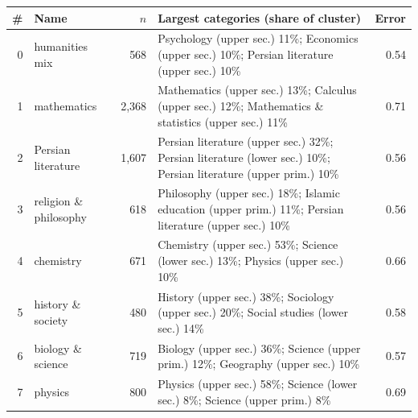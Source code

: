 \begin{tabular}{rlr>{\raggedright\arraybackslash}p{8.2cm}r}
\toprule
\# & Name & $n$ & Largest categories (share of cluster) & Error \\
\midrule
0 & humanities mix & 568 & \footnotesize Psychology (upper sec.) 11\%; Economics (upper sec.) 10\%; Persian literature (upper sec.) 10\% & 0.54 \\
1 & mathematics & 2,368 & \footnotesize Mathematics (upper sec.) 13\%; Calculus (upper sec.) 12\%; Mathematics \& statistics (upper sec.) 11\% & 0.71 \\
2 & Persian literature & 1,607 & \footnotesize Persian literature (upper sec.) 32\%; Persian literature (lower sec.) 10\%; Persian literature (upper prim.) 10\% & 0.56 \\
3 & religion \& philosophy & 618 & \footnotesize Philosophy (upper sec.) 18\%; Islamic education (upper prim.) 11\%; Persian literature (upper sec.) 10\% & 0.56 \\
4 & chemistry & 671 & \footnotesize Chemistry (upper sec.) 53\%; Science (lower sec.) 13\%; Physics (upper sec.) 10\% & 0.66 \\
5 & history \& society & 480 & \footnotesize History (upper sec.) 38\%; Sociology (upper sec.) 20\%; Social studies (lower sec.) 14\% & 0.58 \\
6 & biology \& science & 719 & \footnotesize Biology (upper sec.) 36\%; Science (upper prim.) 12\%; Geography (upper sec.) 10\% & 0.57 \\
7 & physics & 800 & \footnotesize Physics (upper sec.) 58\%; Science (lower sec.) 8\%; Science (upper prim.) 8\% & 0.69 \\
\bottomrule
\end{tabular}
